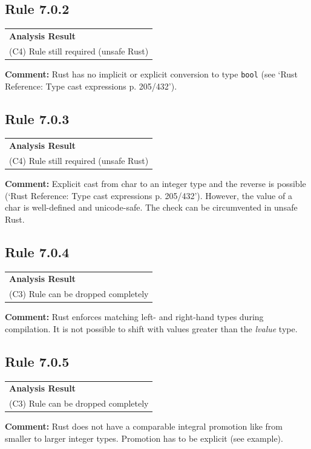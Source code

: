 \subsection*{Rule 7.0.2}
\begin{longtable}{p{13cm}}
\textbf{Analysis Result} \\
(C4) Rule still required (unsafe Rust) \\
\end{longtable}
\textbf{Comment:} Rust has no implicit or explicit conversion to type \texttt{bool} (see `Rust Reference: Type cast expressions p. 205/432'). \\
\subsection*{Rule 7.0.3}
\begin{longtable}{p{13cm}}
\textbf{Analysis Result} \\
(C4) Rule still required (unsafe Rust) \\
\end{longtable}
\textbf{Comment:} Explicit cast from char to an integer type and the reverse is possible (`Rust Reference: Type cast expressions p. 205/432'). However, the value of a char is well-defined and unicode-safe. The check can be circumvented in unsafe Rust. \\
\subsection*{Rule 7.0.4}
\begin{longtable}{p{13cm}}
\textbf{Analysis Result} \\
(C3) Rule can be dropped completely \\
\end{longtable}
\textbf{Comment:} Rust enforces matching left- and right-hand types during compilation. It is not possible to shift with values greater than the \textit{lvalue} type. \\


\subsection*{Rule 7.0.5}
\begin{longtable}{p{13cm}}
\textbf{Analysis Result} \\
(C3) Rule can be dropped completely \\
\end{longtable}
\textbf{Comment:} Rust does not have a comparable integral promotion like \Cpp from smaller to larger integer types. Promotion has to be explicit (see example). \\


